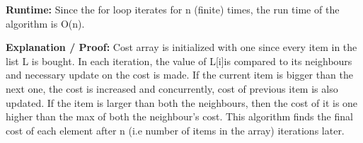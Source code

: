 \documentclass[letterpaper,11pt]{article}
\begin{document}
{\bf Runtime: }
Since the for loop iterates for n (finite) times, the run time of the algorithm is O(n).

{\bf Explanation / Proof:}
Cost array is initialized with one since every item in the list L is bought. In each iteration, the value of L[i]is compared to its neighbours and necessary update on the cost is made.  If the current item is bigger than the next one, the cost is increased and concurrently, cost of previous item is also updated. If the item is larger than both the neighbours, then the cost of it is one higher than the max of both the neighbour’s cost.  This algorithm finds the final cost of each element after n (i.e number of items in the array) iterations later.
\end{document}
